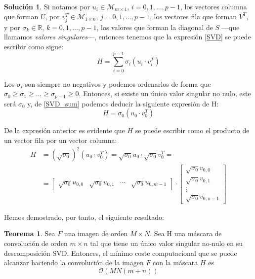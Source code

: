 \documentclass[a4paper, 11pt]{article}
\theoremstyle{definition}
\newtheorem*{solucion}{Solución}
\theoremstyle{theorem}
\newtheorem{teorema}{Teorema}
\begin{document}
\begin{solucion}
      Si notamos por $u_i\in\mathcal{M}_{m\times1}$, $i=0,1,\dots,p-1$, los vectores columna que forman $U$, por $v_j^T\in\mathcal{M}_{1\times n}$, $j=0,1,\dots,p-1$, los vectores fila que forman $V^T$, y por $\sigma_k\in\mathbb{R}$, $k=0,1,\dots,p-1$, los valores que forman la diagonal de $S$ ---que llamamos \emph{valores singulares}---, entonces tenemos que la expresión \eqref{SVD} se puede escribir como sigue:
      \begin{equation}
          H = \sum_{i=0}^{p-1} \sigma_i(u_i \cdot v_i^T) \label{SVD_sum}
      \end{equation}

      Los $\sigma_i$ son siempre no negativos y podemos ordenarlos de forma que $\sigma_0 \geq \sigma_1 \geq \dots \geq \sigma_{p-1} \geq 0$. Entonces, si existe un único valor singular no nulo, este será $\sigma_0$ y, de \eqref{SVD_sum} podemos deducir la siguiente expresión de H:
      \begin{equation}
          H = \sigma_0( u_0 \cdot v_0^T) \label{SVD_3}
      \end{equation}

      De la expresión anterior es evidente que $H$ se puede escribir como el producto de un vector fila por un vector columna:
      \begin{align*}
          H &= (\sqrt{\sigma_0})^2( u_0 \cdot v_0^T) = \sqrt{\sigma_0} u_0 \cdot \sqrt{\sigma_0} v_0^T = \\
          &= \begin{bmatrix}
                \sqrt{\sigma_0}u_{0,0} & \sqrt{\sigma_0}u_{0,1} & \cdots & \sqrt{\sigma_0}u_{0,m-1}
             \end{bmatrix} \cdot
             \begin{bmatrix}
                 \sqrt{\sigma_0}v_{0,0} \\
                 \sqrt{\sigma_0}v_{0,1} \\
                 \vdots \\
                 \sqrt{\sigma_0}v_{0,n-1}
             \end{bmatrix}
      \end{align*}

      Hemos demostrado, por tanto, el siguiente resultado:
      \begin{teorema}
          \label{teorema}
          Sea $F$ una imagen de orden $M\times N$. Sea H una máscara de convolución de orden $m\times n$ tal que tiene un único valor singular no-nulo en su descomposición SVD. Entonces, el mínimo coste computacional que se puede alcanzar haciendo la convolución de la imagen $F$ con la máscara $H$ es
          \[
          \mathcal{O}(MN(m+n))
          \]
      \end{teorema}


\end{solucion}
\end{document}
